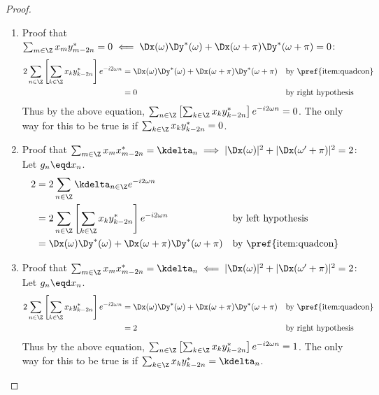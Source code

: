 \begin{proof}
\begin{enumerate}
\item Proof that 
  $\sum_{m\in\Z} x_m y^\ast_{m-2n} = 0
   \impliedby
   \Dx(\omega) \Dy^\ast(\omega) + \Dx(\omega+\pi) \Dy^\ast(\omega+\pi)=0
  $: 
\begin{align*}
  2\sum_{n\in\Z} \left[ \sum_{k\in\Z}x_k y^\ast_{k-2n} \right] e^{-i2\omega n}
    &= \Dx(\omega) \Dy^\ast(\omega) + \Dx(\omega+\pi) \Dy^\ast(\omega+\pi)
    && \text{by \pref{item:quadcon}}
  \\&= 0
    && \text{by right hypothesis}
\end{align*}
Thus by the above equation, 
$\sum_{n\in\Z} \left[ \sum_{k\in\Z}x_k y^\ast_{k-2n} \right] e^{-i2\omega n}=0$.
The only way for this to be true is if 
$\sum_{k\in\Z}x_k y^\ast_{k-2n}=0$.


\item Proof that
  $\sum_{m\in\Z} x_m x^\ast_{m-2n} = \kdelta_n
   \implies
   |\Dx(\omega)|^2 + |\Dx(\omega'+\pi)|^2 = 2
  $: \\
  Let $ g_{n} \eqd x_n$. 
\begin{align*}
  2 
    &= 2\sum_{n\in\Z} \kdelta_{n\in\Z} e^{-i2\omega n}
  \\&= 2\sum_{n\in\Z} \left[ \sum_{k\in\Z}x_k y^\ast_{k-2n} \right] e^{-i2\omega n}
    && \text{by left hypothesis}
  \\&= \Dx(\omega) \Dy^\ast(\omega)
     + \Dx(\omega+\pi) \Dy^\ast(\omega+\pi)
    && \text{by \pref{item:quadcon}}
\end{align*}


\item Proof that 
  $\sum_{m\in\Z} x_m x^\ast_{m-2n} = \kdelta_n
   \impliedby
   |\Dx(\omega)|^2 + |\Dx(\omega'+\pi)|^2 = 2
  $: \\
  Let $ g_{n} \eqd x_n$. 
\begin{align*}
  2\sum_{n\in\Z} \left[ \sum_{k\in\Z}x_k y^\ast_{k-2n} \right] e^{-i2\omega n}
    &= \Dx(\omega) \Dy^\ast(\omega) + \Dx(\omega+\pi) \Dy^\ast(\omega+\pi)
    && \text{by \pref{item:quadcon}}
  \\&= 2
    && \text{by right hypothesis}
\end{align*}
Thus by the above equation, 
$\sum_{n\in\Z} \left[ \sum_{k\in\Z}x_k y^\ast_{k-2n} \right] e^{-i2\omega n}=1$.
The only way for this to be true is if 
$\sum_{k\in\Z}x_k y^\ast_{k-2n}=\kdelta_n$.

\end{enumerate}
\end{proof}



